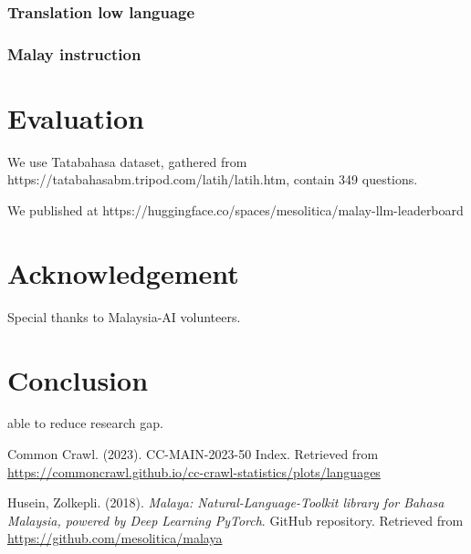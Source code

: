 \documentclass{article}
\begin{document}
\subsubsection{Translation low language}

\subsubsection{Malay instruction}

\section{Evaluation}

We use Tatabahasa dataset, gathered from https://tatabahasabm.tripod.com/latih/latih.htm, contain 349 questions.

We published at https://huggingface.co/spaces/mesolitica/malay-llm-leaderboard

\section{Acknowledgement}

Special thanks to Malaysia-AI volunteers.

\section{Conclusion}

able to reduce research gap.

\begin{thebibliography}{1}

  Common Crawl. (2023).
  \newblock CC-MAIN-2023-50 Index.
  \newblock Retrieved from \url{https://commoncrawl.github.io/cc-crawl-statistics/plots/languages}

  Husein, Zolkepli. (2018).
  \newblock \emph{Malaya: Natural-Language-Toolkit library for Bahasa Malaysia, powered by Deep Learning PyTorch}.
  \newblock GitHub repository. Retrieved from \url{https://github.com/mesolitica/malaya}

\end{thebibliography}
\end{document}
